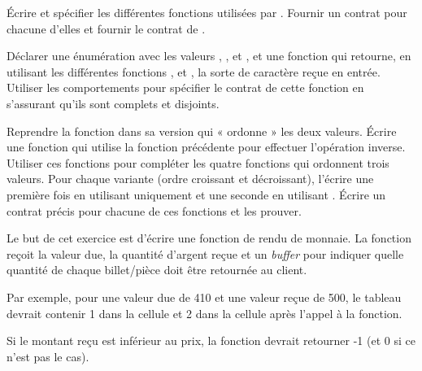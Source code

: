 

\label{l4:contract-modularity-ex-alpha-num}


Écrire et spécifier les différentes fonctions utilisées par
. Fournir un contrat pour chacune d'elles et
fournir le contrat de .





Déclarer une énumération avec les valeurs , ,
 et , et une fonction 
qui retourne, en utilisant les différentes fonctions ,
 et , la sorte de caractère reçue
en entrée. Utiliser les comportements pour spécifier le contrat de cette fonction
en s'assurant qu'ils sont complets et disjoints.





Reprendre la fonction  dans sa version qui « ordonne »
les deux valeurs. Écrire une fonction  qui utilise la
fonction précédente pour effectuer l'opération inverse. Utiliser ces fonctions
pour compléter les quatre fonctions qui ordonnent trois valeurs. Pour chaque
variante (ordre croissant et décroissant), l'écrire une première fois en
utilisant uniquement  et une seconde en utilisant
. Écrire un contrat précis pour chacune de ces fonctions
et les prouver.






Le but de cet exercice est d'écrire une fonction de rendu de monnaie. La
fonction  reçoit la valeur due, la quantité
d'argent reçue et un \textit{buffer} pour indiquer quelle quantité de
chaque billet/pièce doit être retournée au client.


Par exemple, pour une valeur due de 410 et une valeur reçue de 500, le
tableau devrait contenir 1 dans la cellule  et
2 dans la cellule  après l'appel à la fonction.


Si le montant reçu est inférieur au prix, la fonction devrait retourner
-1 (et 0 si ce n'est pas le cas).


